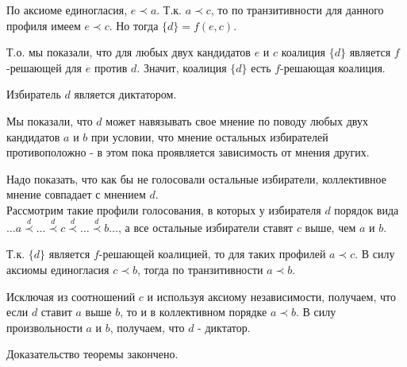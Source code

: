\begin{Proof}
\begin{Proof}
		По аксиоме единогласия, $e \prec a$. Т.к. $a \prec c$, то по транзитивности для данного профиля имеем $e \prec c$. Но тогда $\{d\} = f(e,c)$.

		Т.о. мы показали, что для любых двух кандидатов $e$ и $c$ коалиция $\{d\}$ является $f$-решающей для $e$ против $d$. Значит, коалиция $\{d\}$ есть $f$-решающая коалиция.
	\end{Proof}

	\begin{lemma}[]\label{cha:5/lemma:3}
		Избиратель $d$ является диктатором.
	\end{lemma}
	\begin{Proof}
		Мы показали, что $d$ может навязывать свое мнение по поводу любых двух кандидатов $a$ и $b$ при условии, что мнение остальных избирателей противоположно - в этом пока проявляется зависимость от мнения других.

		Надо показать, что как бы не голосовали остальные избиратели, коллективное мнение совпадает с мнением $d$. \\

		Рассмотрим такие профили голосования, в которых у избирателя $d$ порядок вида $\dots a \overset{d}{\prec} \dots \overset{d}{\prec} c \overset{d}{\prec} \dots \overset{d}{\prec} b \dots$, а все остальные избиратели ставят $c$ выше, чем $a$ и $b$.

		Т.к. $\{d\}$ является $f$-решающей коалицией, то для таких профилей $a \prec c$. В силу аксиомы единогласия $c \prec b$, тогда по транзитивности $a \prec b$. 

		Исключая из соотношений $c$ и используя аксиому независимости, получаем, что если $d$ ставит $a$ выше $b$, то и в коллективном порядке $a \prec b$. В силу произвольности $a$ и $b$, получаем, что $d$ - диктатор.
	\end{Proof}

	Доказательство теоремы закончено.
\end{Proof}

















